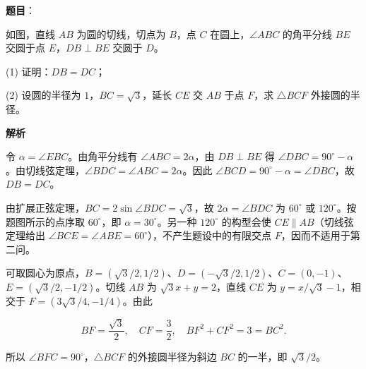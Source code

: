\begin{answer}

\textbf{题目}：

如图，直线 $AB$ 为圆的切线，切点为 $B$，点 $C$ 在圆上，$\angle ABC$ 的角平分线 $BE$ 交圆于点 $E$，$DB\perp BE$ 交圆于 $D$。
\nopagebreak[4]
\begin{center}\end{center}
\nopagebreak[4]
(1) 证明：$DB=DC$；

(2) 设圆的半径为 $1$，$BC=\sqrt3$，延长 $CE$ 交 $AB$ 于点 $F$，求 $\triangle BCF$ 外接圆的半径。

\textbf{解析}


令 $\alpha=\angle EBC$。由角平分线有 $\angle ABC=2\alpha$，由 $DB\perp BE$ 得 $\angle DBC=90^\circ-\alpha$。由切线弦定理，$\angle BDC=\angle ABC=2\alpha$。因此 $\angle BCD=90^\circ-\alpha=\angle DBC$，故 $DB=DC$。


由扩展正弦定理，$BC=2\sin\angle BDC=\sqrt3$，故 $2\alpha=\angle BDC$ 为 $60^\circ$ 或 $120^\circ$。按题图所示的点序取 $60^\circ$，即 $\alpha=30^\circ$。另一种 $120^\circ$ 的构型会使 $CE\parallel AB$（切线弦定理给出 $\angle BCE=\angle ABE=60^\circ$），不产生题设中的有限交点 $F$，因而不适用于第二问。

可取圆心为原点，$B=(\sqrt3/2,1/2)$、$D=(-\sqrt3/2,1/2)$、$C=(0,-1)$、$E=(\sqrt3/2,-1/2)$。切线 $AB$ 为 $\sqrt3x+y=2$，直线 $CE$ 为 $y=x/\sqrt3-1$，相交于 $F=(3\sqrt3/4,-1/4)$。由此

\nopagebreak[4]
\[
BF=\frac{\sqrt3}2,\quad CF=\frac32,\quad
BF^2+CF^2=3=BC^2.
\]

所以 $\angle BFC=90^\circ$，$\triangle BCF$ 的外接圆半径为斜边 $BC$ 的一半，即 $\sqrt3/2$。



\end{answer}
